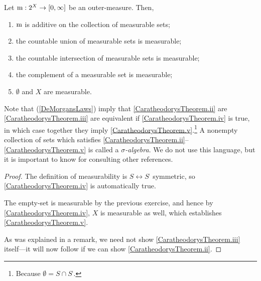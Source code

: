 \begin{thm}\label{CaratheodorysTheorem}
Let $\mathrm{m} :2^X\rightarrow [0,\infty ]$ be an outer-measure.  Then,
\begin{enumerate}
\item \label{CaratheodorysTheorem.i}$\mathrm{m}$ is additive on the collection of measurable sets;
\item \label{CaratheodorysTheorem.ii}the countable union of measurable sets is measurable;
\item \label{CaratheodorysTheorem.iii}the countable intersection of measurable sets is measurable;
\item \label{CaratheodorysTheorem.iv}the complement of a measurable set is measurable;
\item \label{CaratheodorysTheorem.v}$\emptyset$ and $X$ are measurable.
\end{enumerate}
\begin{rmk}
Note that  (\cref{DeMorgansLaws}) imply that \ref{CaratheodorysTheorem.ii} are \ref{CaratheodorysTheorem.iii} are equivalent if \ref{CaratheodorysTheorem.iv} is true, in which case together they imply \ref{CaratheodorysTheorem.v}.\footnote{Because $\emptyset =S\cap S^{\comp}$.}  A nonempty collection of sets which satisfies \ref{CaratheodorysTheorem.ii}--\ref{CaratheodorysTheorem.v} is called a \emph{$\sigma$-algebra}.  We do not use this language, but it is important to know for consulting other references.
\end{rmk}
\begin{proof}
The definition of measurability is $S\leftrightarrow S^{\comp}$ symmetric, so \ref{CaratheodorysTheorem.iv} is automatically true.

The empty-set is measurable by the previous exercise, and hence by \ref{CaratheodorysTheorem.iv}, $X$ is measurable as well, which establishes \ref{CaratheodorysTheorem.v}.

As was explained in a remark, we need not show \ref{CaratheodorysTheorem.iii} itself---it will now follow if we can show \ref{CaratheodorysTheorem.ii}.


\end{proof}
\end{thm}
